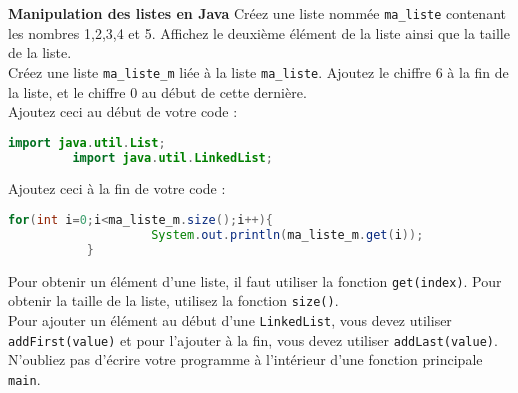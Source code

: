 	     
	\begin{Exercice}[10 minutes] \textbf{Manipulation des listes en Java}
      	Créez une liste nommée \lstinline{ma_liste} contenant les nombres 1,2,3,4 et 5. Affichez le deuxième élément de la liste ainsi que la taille de la liste. \\
      	
      	Créez une liste \lstinline{ma_liste_m} liée à la liste \lstinline{ma_liste}. Ajoutez le chiffre 6 à la fin de la liste, et le chiffre 0 au début de cette dernière. \\
      	
      	Ajoutez ceci au début de votre code : \\
       
      	\begin{lstlisting}[language=Java]
             import java.util.List;
	     import java.util.LinkedList; \end{lstlisting}
	     
	     Ajoutez ceci à la fin de votre code : \\
	     
	    \begin{lstlisting}[language=Java]
             for(int i=0;i<ma_liste_m.size();i++){
            		System.out.println(ma_liste_m.get(i));
	       } \end{lstlisting} 
    
        \begin{conseil}
            Pour obtenir un élément d'une liste, il faut utiliser la fonction \lstinline{get(index)}. Pour obtenir la taille de la liste, utilisez la fonction \lstinline{size()}. \\
            
            Pour ajouter un élément au début d'une \lstinline{LinkedList}, vous devez utiliser \lstinline{addFirst(value)} et pour l'ajouter à la fin, vous devez utiliser \lstinline{addLast(value)}. \\
            
           	N'oubliez pas d'écrire votre programme à l'intérieur d'une fonction principale \lstinline{main}. \\
           	
           	
		     
        \end{conseil}
        
        \begin{solution}
            
        \end{solution}
    \end{Exercice}
    
